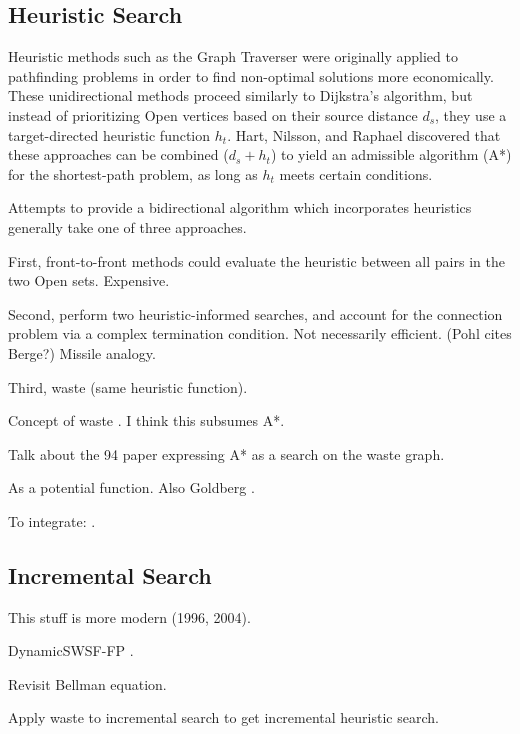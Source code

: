 \documentclass[nobib]{tufte-book}
\newcommand{\cdnote}[1]{{\xxnote{CD}{blue}{#1}}}
\newcommand{\xxnote}[3]{}
\renewcommand{\xxnote}[3]{\color{#2}{#1: #3}}
\begin{document}
\subsection{Heuristic Search}

Heuristic methods such as the Graph Traverser
\citep{doran1966graphtraverser} were originally
applied to pathfinding problems in order to find non-optimal
solutions more economically.
These unidirectional methods proceed similarly to Dijkstra's algorithm,
but instead of prioritizing {\sc Open} vertices
based on their source distance $d_s$,
they use a target-directed heuristic function $h_t$.
Hart, Nilsson, and Raphael \citep{hart1968astar} discovered that
these approaches can be combined ($d_s + h_t$) to yield
an admissible algorithm (A*) for the shortest-path problem,
as long as $h_t$ meets certain conditions.

Attempts to provide a bidirectional algorithm which incorporates
heuristics generally take one of three approaches.
\cdnote{I need to deep-dive here to write this correctly.}

First,
front-to-front methods
could evaluate the heuristic between all pairs in the two
{\sc Open} sets.
Expensive.

Second,
perform two heuristic-informed searches,
and account for the connection problem via a complex
termination condition.
Not necessarily efficient.
(Pohl cites Berge?)
Missile analogy.

Third,
waste (same heuristic function).

Concept of waste \citep{pohl1969bidirectional}.
I think this subsumes A*.

Talk about the 94 paper \citep{ikeda1994betterroutes}
expressing A* as a search on
the waste graph.

As a potential function.
Also Goldberg \citep{goldberg2005spexternalmemory}.

To integrate: \citep{dechter1984bfsastaropt}.

\subsection{Incremental Search}

This stuff is more modern (1996, 2004).

DynamicSWSF-FP \citep{ramalingam1996}.

Revisit Bellman equation.

Apply waste to incremental search to get
incremental heuristic search.
\end{document}
